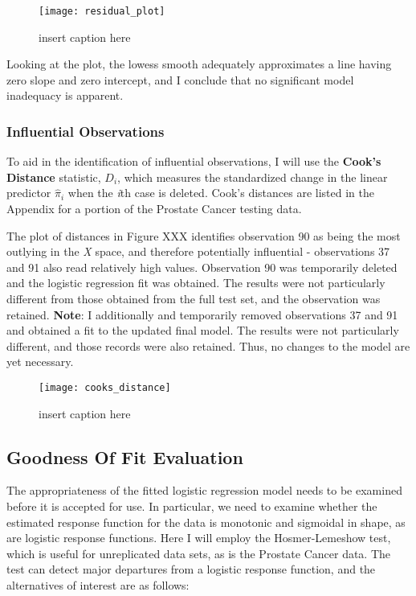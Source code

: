 \begin{figure}[H]
	\centering
	\texttt{[image: residual\_plot]}
	\caption{insert caption here}
\end{figure}

Looking at the plot, the lowess smooth adequately approximates a line having zero slope and zero intercept, and I conclude that no significant model inadequacy is apparent. 


\subsubsection{Influential Observations}
To aid in the identification of influential observations, I will use the \textbf{Cook's Distance} statistic, \(D_i\), which measures the standardized change in the linear predictor \(\hat{\pi}_i\) when the \textit{i}th case is deleted. Cook's distances are listed in the Appendix for a portion of the Prostate Cancer testing data. \par
The plot of distances in Figure XXX identifies observation 90 as being the most outlying in the \textit{X} space, and therefore potentially influential - observations 37 and 91 also read relatively high values. Observation 90 was temporarily deleted and the logistic regression fit was obtained. The results were not particularly different from those obtained from the full test set, and the observation was retained. 
\textbf{Note}: I additionally and temporarily removed observations 37 and 91 and obtained a fit to the updated final model. The results were not particularly different, and those records were also retained. Thus, no changes to the model are yet necessary.

\begin{figure}[H]
	\centering
	\texttt{[image: cooks\_distance]}
	\caption{insert caption here}
\end{figure}

\subsection{Goodness Of Fit Evaluation}
The appropriateness of the fitted logistic regression model needs to be examined before it is accepted for use. In particular, we need to examine whether the estimated response function for the data is monotonic and sigmoidal in shape, as are logistic response functions. Here I will employ the Hosmer-Lemeshow test, which is useful for unreplicated data sets, as is the Prostate Cancer data. The test can detect major departures from a logistic response function, and the alternatives of interest are as follows:

